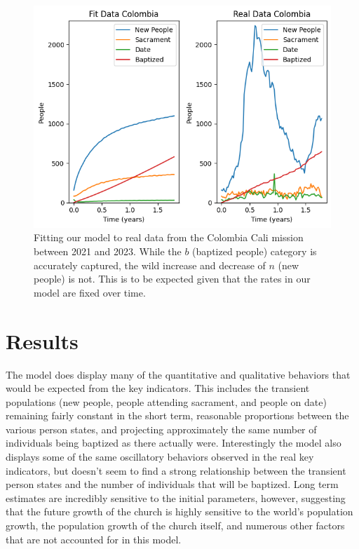 \documentclass[11pt]{amsart}
\begin{document}
\begin{figure}[htb]
\begin{center} %
\includegraphics[width=1\textwidth]{FitColombia.png} %
\end{center}
\caption{Fitting our model to real data from the Colombia Cali mission between 2021 and 2023. While the $b$ (baptized people) category is accurately captured, the wild increase and decrease of $n$ (new people) is not. This is to be expected given that the rates in our model are fixed over time.}
\label{fig:FitColombia} %
\end{figure}


\section{Results}

The model does display many of the quantitative and qualitative behaviors that would be expected from the key indicators. This includes the transient populations (new people, people attending sacrament, and people on date) remaining fairly constant in the short term, reasonable proportions between the various person states, and projecting approximately the same number of individuals being baptized as there actually were. Interestingly the model also displays some of the same oscillatory behaviors observed in the real key indicators, but doesn't seem to find a strong relationship between the transient person states and the number of individuals that will be baptized. Long term estimates are incredibly sensitive to the initial parameters, however, suggesting that the future growth of the church is highly sensitive to the world's population growth, the population growth of the church itself, and numerous other factors that are not accounted for in this model.
\end{document}
